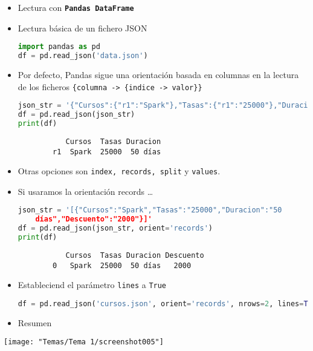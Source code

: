 \begin{itemize}[label=\color{red}\textbullet, leftmargin=*]
	\item \color{lightblue}Lectura con \textbf{\texttt{Pandas DataFrame}}
\end{itemize}
\begin{itemize}
	\item Lectura básica de un fichero JSON
	\begin{lstlisting}[language=python]
import pandas as pd
df = pd.read_json('data.json')
	\end{lstlisting}
	\item Por defecto, Pandas sigue una orientación basada en columnas en la lectura de los ficheros \texttt{\{columna -> \{indice -> valor\}\}}
\begin{lstlisting}[language=python]
json_str = '{"Cursos":{"r1":"Spark"},"Tasas":{"r1":"25000"},"Duracion":{"r1":"50 días"}}'
df = pd.read_json(json_str)
print(df)
\end{lstlisting}
\begin{center}
	\begin{verbatim}
		   Cursos  Tasas Duracion
		r1  Spark  25000  50 días
	\end{verbatim}
\end{center}
\item Otras opciones son \texttt{index, records, split} y \texttt{values}.
\item Si usaramos la orientación records \dots
\begin{lstlisting}[language=python]
json_str = '[{"Cursos":"Spark","Tasas":"25000","Duracion":"50
	días","Descuento":"2000"}]'
df = pd.read_json(json_str, orient='records')
print(df)
\end{lstlisting}
\begin{center}
	\begin{verbatim}
		   Cursos  Tasas Duracion Descuento
		0   Spark  25000  50 días   2000
	\end{verbatim}
\end{center}
\item Estableciend el parámetro \texttt{lines} a \texttt{True}
\begin{lstlisting}[language=python]
df = pd.read_json('cursos.json', orient='records', nrows=2, lines=True)
\end{lstlisting}
\end{itemize}
\begin{itemize}[label=\color{red}\textbullet, leftmargin=*]
	\item \color{lightblue}Resumen
\end{itemize}
\begin{center}
	\texttt{[image: "Temas/Tema 1/screenshot005"]}
\end{center}

